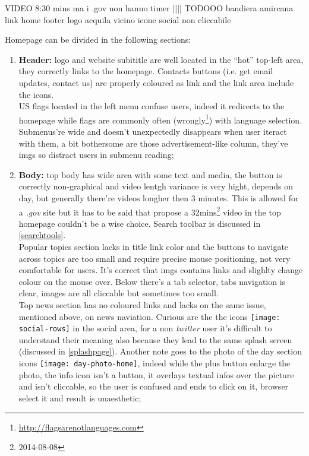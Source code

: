 \documentclass[
10pt, %
a4paper, %
oneside, %
headinclude,footinclude, %
BCOR5mm, %
]{scrartcl}
\begin{document}
VIDEO 8:30 mins ma i .gov non hanno timer
 |||| TODOOO
bandiera amircana link home
footer logo acquila vicino icone social non cliccabile

Homepage can be divided in the following sections:
	
	\begin{enumerate}
		
		\item \textbf{Header:} logo and website subititle are well located in the ``hot'' top-left area, they correctly links to the homepage. Contacts buttons (i.e. get email updates, contact us) are properly coloured as link and the link area include the icons. \\
		US flags located in the left menu confuse users, indeed it redirects to the homepage while flags are commonly often (wrongly\footnote{\href{http://flagsarenotlanguages.com}{http://flagsarenotlanguages.com}}) with language selection. \\
		Submenus're wide and doesn't unexpectedly disappears when user iteract with them, a bit bothersome are those advertisement-like column, they've imgs so distract users in submenu reading;
		
		\item \textbf{Body:} top body has wide area with some text and media, the button is correctly non-graphical and video lentgh variance is very hight, depends on day, but generally there're videos longher then 3 minutes. This is allowed for a \emph{.gov} site but it has to be said that propose a 32mins\footnote{2014-08-08} video in the top homepage couldn't be a wise choice. Search toolbar is discussed in \ref{searchtools}. \\
		Popular topics section lacks in title link color and the buttons to navigate across topics are too small and require precise mouse positioning, not very comfortable for users. It's correct that imgs contains links and slighlty change colour on the mouse over. Below there's a tab selector, tabs navigation is clear, images are all cliccable but sometimes too small. \\
		Top news section has no coloured links and lacks on the same issue, mentioned above, on news naviation. Curious are the the icons \texttt{[image: social-rows]} in the social area, for a non \emph{twitter} user it's difficult to understand their meaning also because they lead to the same splash screen (discussed in \ref{splashpage}). Another note goes to the photo of the day section icons \texttt{[image: day-photo-home]}, indeed while the plus button enlarge the photo, the info icon isn't a button, it overlays textual infos over the picture and isn't cliccable, so the user is confused and ends to click on it, browser select it and result is unaesthetic;
		

\end{enumerate}
\end{document}

